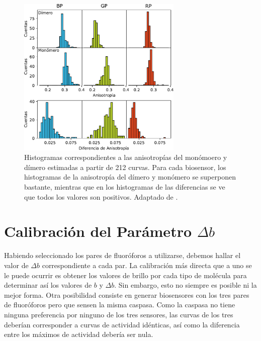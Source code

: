 \begin{figure}
    \centering
    \includegraphics[width=0.7\textwidth]{img/cap_3/anisotropy_histograms_all.pdf}
    \caption{\footnotesize{Histogramas correspondientes a las anisotropías del monómoero y dímero estimadas a partir de 212 curvas. Para cada biosensor, los histogramas de la anisotropía del dímero y monómero se superponen bastante, mientras que en los histogramas de las diferencias se ve que todos los valores son positivos. Adaptado de \cite{Habif2021}.}}
    \label{fig:anisotropy_histogram}
\end{figure}


\section{Calibración del Parámetro \texorpdfstring{$\Delta b$}{Deltab}}


Habiendo seleccionado los pares de fluoróforos a utilizarse, debemos hallar el valor de $\Delta b$ correspondiente a cada par. La calibración más directa que a uno se le puede ocurrir es obtener los valores de brillo por cada tipo de molécula para determinar así los valores de $b$ y $\Delta b$. Sin embargo, esto no siempre es posible ni la mejor forma. Otra posibilidad consiste en generar biosensores con los tres pares de fluoróforos pero que sensen la misma caspasa. Como la caspasa no tiene ninguna preferencia por ninguno de los tres sensores, las curvas de los tres deberían corresponder a curvas de actividad idénticas, así como la diferencia entre los máximos de actividad debería ser nula.

